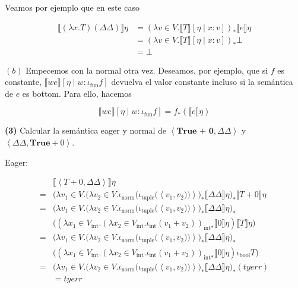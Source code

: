 \documentclass[article, 12pt]{article}
\begin{document}
Veamos por ejemplo que en este caso

\begin{align*}
\llbracket (\lambda x.T)(\Delta \Delta) \rrbracket\eta 
&=(\lambda v \in V. \llbracket T \rrbracket[\eta \mid x : v])_* \llbracket e
\rrbracket\eta \\ 
&=(\lambda v \in V. \llbracket T \rrbracket[\eta \mid x : v])_* \bot  \\ 
&=\bot 
\end{align*}

$(b)$ Empecemos con la normal otra vez. Deseamos, por ejemplo, que si $f$ es
constante, $\llbracket we \rrbracket[\eta \mid w : \iota_{\text{fun}} f]$
devuelva el valor constante incluso si la semántica de $e$ es bottom. Para ello, 
hacemos 

\begin{equation*}
    \llbracket we \rrbracket[\eta \mid w : \iota_{\text{fun}} f] =
    f_*(\llbracket e \rrbracket\eta)
\end{equation*}

\pagebreak 

\begin{myframe}
    \textbf{(3)} Calcular la semántica eager y normal de $\left<\textbf{True +
    0}, \Delta \Delta\right>$ y $\left<\Delta \Delta, \textbf{True} + 0 \right>$.
\end{myframe}

Eager:

\begin{align*}
 &\llbracket \left<T + 0, \Delta \Delta \right> \rrbracket\eta  \\ 
=&\Big( \lambda v_1 \in V. \big( \lambda v_2 \in V. \iota_{\text{norm}}(
\iota_{\text{tuple}}( \left<v_1, v_2 ) ) \right> \big)_{*} \llbracket \Delta
\Delta\rrbracket\eta \Big)_{*} \llbracket T + 0 \rrbracket\eta\\
=&\Big( \lambda v_1 \in V. \big( \lambda v_2 \in V. \iota_{\text{norm}}(
\iota_{\text{tuple}}( \left<v_1, v_2 ) ) \right> \big)_{*} \llbracket \Delta
\Delta\rrbracket\eta \Big)_{*} \\ 
 &\Big((\lambda x_1 \in V_{\text{int}}.\left(  \lambda
    x_2\in V_{\text{int}}.
\iota_{\text{int}}(v_1 + v_2)  \right)_{\text{int}*}\llbracket 0 \rrbracket\eta
)\llbracket T \rrbracket\eta\Big) \\ 
=&\Big( \lambda v_1 \in V. \big( \lambda v_2 \in V. \iota_{\text{norm}}(
\iota_{\text{tuple}}( \left<v_1, v_2 ) ) \right> \big)_{*} \llbracket \Delta
\Delta\rrbracket\eta \Big)_{*} \\ 
 &\Big((\lambda x_1 \in V_{\text{int}}.\left(  \lambda
    x_2\in V_{\text{int}}.
\iota_{\text{int}}(v_1 + v_2)  \right)_{\text{int}*}\llbracket 0 \rrbracket\eta
) \iota_{\text{bool}} T\Big)\\ 
=&\Big( \lambda v_1 \in V. \big( \lambda v_2 \in V. \iota_{\text{norm}}(
\iota_{\text{tuple}}( \left<v_1, v_2 ) ) \right> \big)_{*} \llbracket \Delta
\Delta\rrbracket\eta \Big)_{*} (tyerr) \\ 
 &= tyerr
\end{align*}
\end{document}

